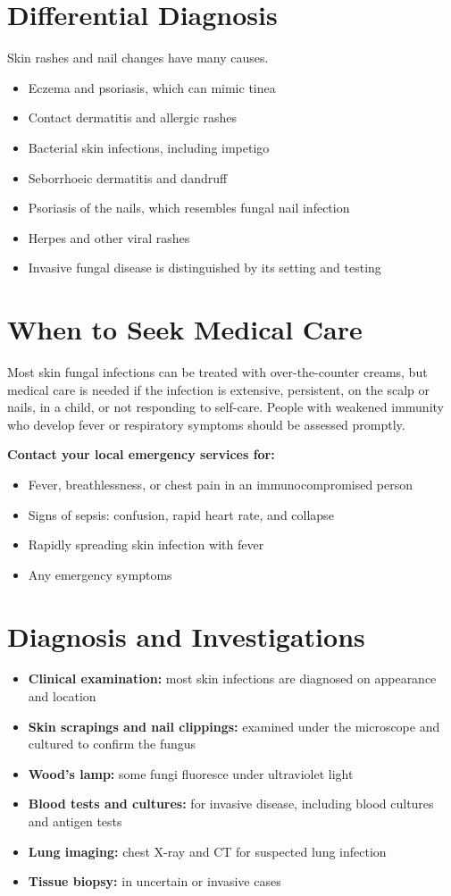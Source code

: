 \section*{Differential Diagnosis}
Skin rashes and nail changes have many causes.
\begin{itemize}
    \item Eczema and psoriasis, which can mimic tinea
    \item Contact dermatitis and allergic rashes
    \item Bacterial skin infections, including impetigo
    \item Seborrhoeic dermatitis and dandruff
    \item Psoriasis of the nails, which resembles fungal nail infection
    \item Herpes and other viral rashes
    \item Invasive fungal disease is distinguished by its setting and testing
\end{itemize}

\section*{When to Seek Medical Care}
Most skin fungal infections can be treated with over-the-counter creams, but medical care is needed if the infection is extensive, persistent, on the scalp or nails, in a child, or not responding to self-care. People with weakened immunity who develop fever or respiratory symptoms should be assessed promptly.

\textbf{Contact your local emergency services for:}
\begin{itemize}
    \item Fever, breathlessness, or chest pain in an immunocompromised person
    \item Signs of sepsis: confusion, rapid heart rate, and collapse
    \item Rapidly spreading skin infection with fever
    \item Any emergency symptoms
\end{itemize}

\section*{Diagnosis and Investigations}
\begin{itemize}
    \item \textbf{Clinical examination:} most skin infections are diagnosed on appearance and location
    \item \textbf{Skin scrapings and nail clippings:} examined under the microscope and cultured to confirm the fungus
    \item \textbf{Wood's lamp:} some fungi fluoresce under ultraviolet light
    \item \textbf{Blood tests and cultures:} for invasive disease, including blood cultures and antigen tests
    \item \textbf{Lung imaging:} chest X-ray and CT for suspected lung infection
    \item \textbf{Tissue biopsy:} in uncertain or invasive cases
\end{itemize}

